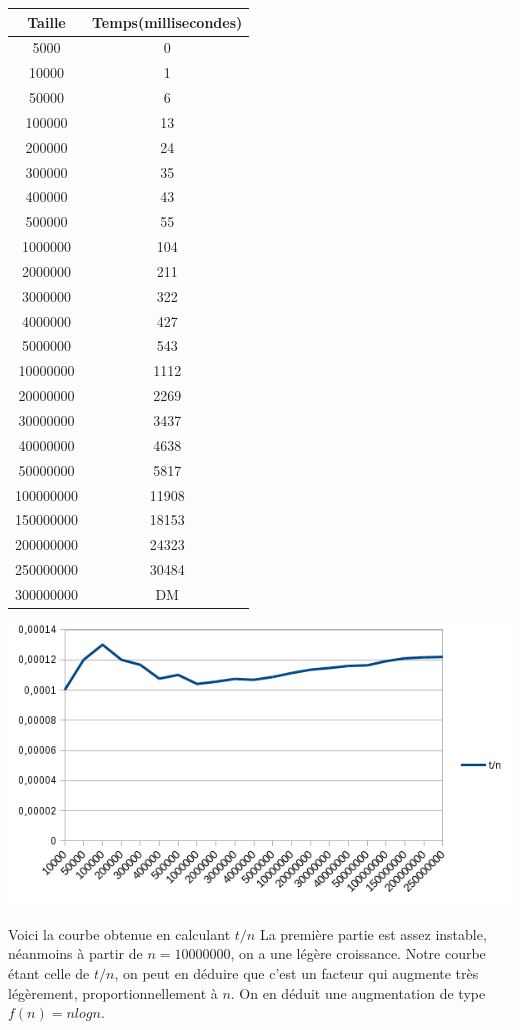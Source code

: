 \documentclass[a4paper, 12pt]{article}
\begin{document}
\begin{minipage}[c]{0.4\linewidth}
\begin{tabular}{|c|c|}
\hline
Taille & Temps(millisecondes) \\
\hline
5000&	0\\
10000&	1\\
50000&	6\\
100000&	13\\
200000&	24\\
300000&	35\\
400000&	43\\
500000&	55\\
1000000&	104\\
2000000	& 211\\
3000000&	322\\
4000000	& 427\\
5000000	& 543\\
10000000&	1112\\
20000000&	2269\\
30000000&	3437\\
40000000&	4638\\
50000000&	5817\\
100000000&	11908\\
150000000&	18153\\
200000000&	24323\\
250000000&	30484\\
300000000 &  DM \\
\hline
\end{tabular}
\end{minipage}\hfill
\begin{minipage}[c]{0.5\linewidth}
	\includegraphics[scale=0.6]{curve_algo_3.png}
	
	
    Voici la courbe obtenue en calculant $t/n$
    La première partie est assez instable, néanmoins à partir de $n=10 000 000$, on a une légère croissance. Notre courbe étant celle de $t/n$, on peut en déduire que c'est un facteur qui augmente très légèrement, proportionnellement à $n$.
    On en déduit une augmentation de type $f(n) = n log n$.
\end{minipage}\hfill
\end{document}
